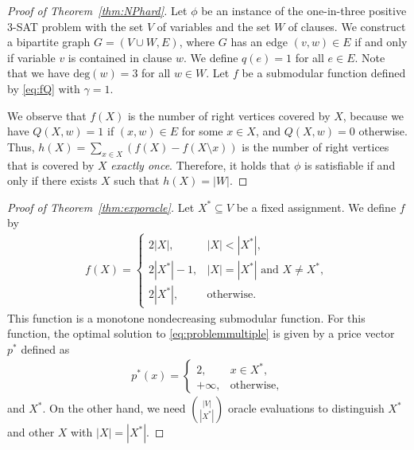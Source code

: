 \documentclass[letterpaper]{article}
\theoremstyle{definition}
\begin{document}
\begin{proof}[Proof of Theorem~\ref{thm:NPhard}]
Let $\phi$ be an instance of the one-in-three positive 3-SAT problem with the set $V$ of variables and the set $W$ of clauses. 
We construct a bipartite graph $G=(V \cup W, E)$, where $G$ has an edge $(v, w) \in E$ if and only if variable $v$ is contained in clause $w$. 
We define $q(e)=1$ for all $e \in E$. 
Note that we have $\mathrm{deg}(w) = 3$ for all $w \in W$. 
Let $f$ be a submodular function defined by \eqref{eq:fQ} with $\gamma = 1$.

We observe that $f(X)$ is the number of right vertices covered by $X$, because we have $Q(X, w) = 1$ if $(x, w) \in E$ for some $x \in X$, and $Q(X, w) = 0$ otherwise. 
Thus, $h(X) = \sum_{x \in X} (f(X) - f(X \setminus x))$ is the number of right vertices that is covered by $X$ \emph{exactly once}. 
Therefore, it holds that $\phi$ is satisfiable if and only if there exists $X$ such that $h(X) = |W|$.
\end{proof}

\begin{proof}[Proof of Theorem~\ref{thm:exporacle}]
Let $X^* \subseteq V$ be a fixed assignment. We define $f$ by 
\begin{align}
  f(X) = \begin{cases}
    2|X|, & |X| < |X^*|, \\
    2|X^*| - 1, & |X| = |X^*| \text{ and } X \neq X^*, \\
    2|X^*|, & \text{otherwise}.
  \end{cases}
\end{align}
This function is a monotone nondecreasing submodular function.
For this function, the optimal solution to \eqref{eq:problemmultiple} is given by a price vector $p^*$ defined as
\begin{align}
  p^*(x) = \begin{cases}
    2, & x \in X^*, \\
    +\infty, & \text{otherwise,}
  \end{cases}
\end{align}
and $X^*$.
On the other hand, we need %
${|V| \choose |X^*|}$ %
oracle evaluations to distinguish $X^*$ and other $X$ with $|X| = |X^*|$.
\end{proof}
\end{document}
